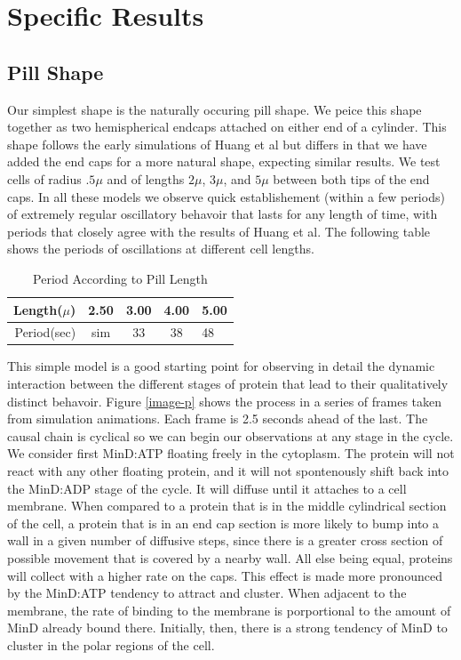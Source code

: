 \documentclass[letterpaper,twocolumn,amsmath,amssymb,pre]{revtex4-1}
\begin{document}
\section{Specific Results}
\subsection{Pill Shape}



Our simplest shape is the naturally occuring pill shape.  We peice this shape
together as two hemispherical endcaps attached on either end of a
cylinder.  This shape follows the early simulations of Huang et al but
differs in that we have added the end caps for a more natural shape,
expecting similar results.  We test cells of radius $.5\mu$ and of
lengths $2\mu$, $3\mu$, and $5\mu$ between both tips of the end
caps. In all these models we observe quick establishement (within a
few periods) of extremely regular oscillatory behavoir that lasts for
any length of time, with periods that closely agree with the results
of Huang et al.  The following table shows the periods of oscillations
at different cell lengths.

\begin{table}
  \begin{tabular}{|r|c|c|c|l|}
    \hline
    Length($\mu$) & 2.50 & 3.00 & 4.00 & 5.00\\
    \hline
    Period(sec) & sim & 33 & 38 & 48 \\ \cline{2-2}
    \hline
  \end{tabular}
  \caption{Period According to Pill Length}
  \label{table-p}
\end{table}

This simple model is a good starting point for observing in detail the
dynamic interaction between the different stages of protein that lead
to their qualitatively distinct behavoir. Figure \ref{image-p} shows
the process in a series of frames taken from simulation animations.
Each frame is 2.5 seconds ahead of the last.  The causal chain is
cyclical so we can begin our observations at any stage in the cycle.
We consider first MinD:ATP floating freely in the cytoplasm.  The
protein will not react with any other floating protein, and it will
not spontenously shift back into the MinD:ADP stage of the cycle.  It
will diffuse until it attaches to a cell membrane.  When compared to a
protein that is in the middle cylindrical section of the cell, a
protein that is in an end cap section is more likely to bump into a
wall in a given number of diffusive steps, since there is a greater
cross section of possible movement that is covered by a nearby wall.
All else being equal, proteins will collect with a higher rate on the
caps.  This effect is made more pronounced by the MinD:ATP tendency to
attract and cluster.  When adjacent to the membrane, the rate of
binding to the membrane is porportional to the amount of MinD already
bound there.  Initially, then, there is a strong tendency of MinD to
cluster in the polar regions of the cell.
\end{document}
